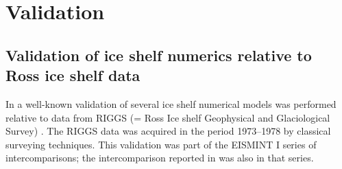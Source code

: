 \documentclass[11pt,final]{amsart}
\begin{document}

\clearpage\newpage
\section{Validation}\label{sect:valid}

\subsection{Validation of ice shelf numerics relative to Ross ice shelf data}  In \cite{MacAyealetal} a well-known validation of several ice shelf numerical models was performed relative to data from RIGGS (= Ross Ice shelf Geophysical and Glaciological Survey) \cite{RIGGS1,RIGGS2}.  The RIGGS data was acquired in the period 1973--1978 by classical surveying techniques.   This validation was part of the EISMINT I  series of intercomparisons; the intercomparison reported in \cite{EISMINT96} was also in that series.
\end{document}
